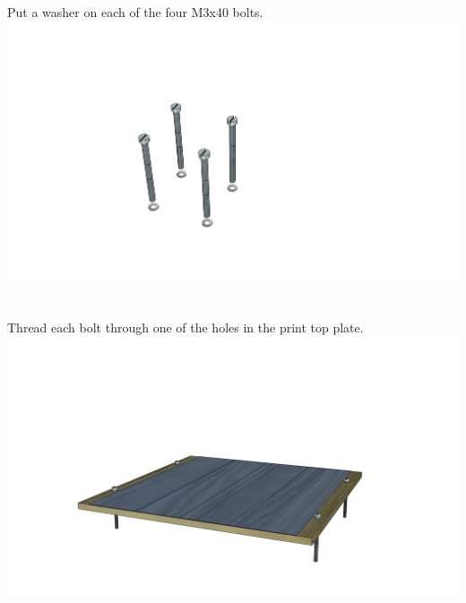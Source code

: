 \documentclass[twoside,openany,a4paper,titlepage]{memoir}
\begin{document}
	\section{}
	Put a washer on each of the four M3x40 bolts.\\
	\includegraphics[width=1\linewidth]{graphics/ch11_2.png}
	
	\section{}
	Thread each bolt through one of the holes in the print top plate.\\
	\includegraphics[width=1\linewidth]{graphics/ch11_3.png}
	
\end{document}
